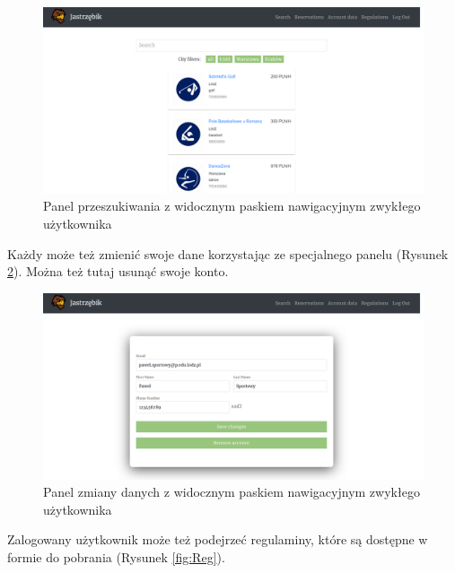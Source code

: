 \documentclass[a4paper,11pt]{article}
\begin{document}
    \begin{figure}[H] 
    	\begin{center}
    		\includegraphics[width=1\textwidth]{img3/Search.png}
            \caption{Panel przeszukiwania z widocznym paskiem nawigacyjnym zwykłego użytkownika}
            \label{fig:Search}
    	\end{center}
    \end{figure}    
    
    Każdy może też zmienić swoje dane korzystając ze specjalnego panelu (Rysunek \ref{fig:Data}). Można też tutaj usunąć swoje konto.
    
    \begin{figure}[H] 
    	\begin{center}
    		\includegraphics[width=1\textwidth]{img3/AccData.png}
            \caption{Panel zmiany danych z widocznym paskiem nawigacyjnym zwykłego użytkownika}
            \label{fig:Data}
    	\end{center}
    \end{figure}      
    
    Zalogowany użytkownik może też podejrzeć regulaminy, które są dostępne w formie do pobrania (Rysunek \ref{fig:Reg}).
        
\end{document}
